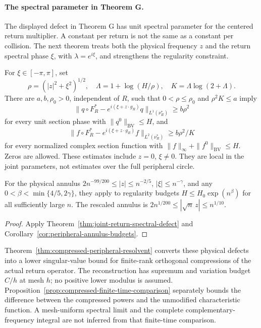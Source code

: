 \paragraph{The spectral parameter in Theorem G.}
The displayed defect in Theorem G has unit spectral parameter for the
centered return multiplier. A constant per return is not the same as a
constant per collision. The next theorem treats both the physical
frequency $z$ and the return spectral phase $\xi$, with
$\lambda=e^{i\xi}$, and strengthens the regularity constraint.

\begin{maintheorem}
\label{thm:intro-peripheral-neighborhood}
For $\xi\in[-\pi,\pi]$, set
\[
 \rho=(|z|^2+\xi^2)^{1/2},\quad
 \Lambda=1+\log(H/\rho),\quad K=\Lambda\log(2+\Lambda).
\]
There are $a,b,\rho_0>0$, independent of $R$, such that
$0<\rho\le\rho_0$ and $\rho^2K\le a$ imply
\[
 \|q\circ F_R^*-e^{i(\xi+z\cdot g_R)}q\|_{L^1(\nu_R^*)}
       \ge b\rho^2
\]
for every unit section phase with $\|q^0\|_{\mathrm{BV}}\le H$,
and
\[
 \|f\circ F_R^*-e^{i(\xi+z\cdot g_R)}f\|_{L^2(\nu_R^*)}
       \ge b\rho^2/K
\]
for every normalized complex section function with
$\|f\|_\infty+\|f^0\|_{\mathrm{BV}}\le H$. Zeros are allowed.
These estimates include $z=0$, $\xi\ne0$. They are local in the joint
parameters, not estimates over the full peripheral circle.

For the physical annulus $2n^{-99/200}\le|z|\le n^{-2/5}$,
$|\xi|\le n^{-\gamma}$, and any
$0<\beta<\min\{4/5,2\gamma\}$, they apply to regularity budgets
$H\le H_0\exp(n^\beta)$ for all sufficiently large $n$.
The rescaled annulus is $2n^{1/200}\le|\sqrt n\,z|\le n^{1/10}$.
\end{maintheorem}
\begin{proof}
Apply Theorem~\ref{thm:joint-return-spectral-defect} and
Corollary~\ref{cor:peripheral-annulus-budgets}.
\end{proof}

Theorem~\ref{thm:compressed-peripheral-resolvent} converts these physical
defects into a lower singular-value bound for finite-rank orthogonal
compressions of the actual return operator. The reconstruction has
supremum and variation budget $C/h$ at mesh $h$; no positive lower
modulus is assumed. Proposition~\ref{prop:compressed-finite-time-comparison}
separately bounds the difference between the compressed powers and the
unmodified characteristic function. A mesh-uniform spectral limit and
the complete complementary-frequency integral are not inferred from
that finite-time comparison.


